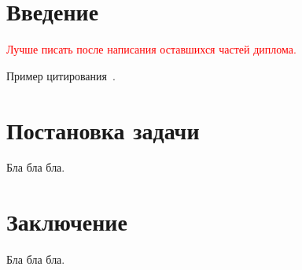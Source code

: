 \documentclass[oneside,senior,etd]{BYUPhys}
\newcommand{\todo}[1]{\textcolor{red}{#1}}
\begin{document}
\fixmargins
 \makepreliminarypages

\oneandhalfspace

\tableofcontents

\section{Введение}

\todo{Лучше писать после написания оставшихся частей диплома.}

Пример цитирования~\cite{tanenbaum2015, halperin08, heartbleed, vishnyakov18}.

\section{Постановка задачи}

Бла бла бла.

\section{Заключение}

Бла бла бла.

\raggedright

\end{document}
